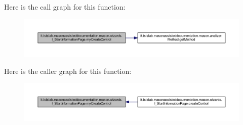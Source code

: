 Here is the call graph for this function\-:\nopagebreak
\begin{figure}[H]
\begin{center}
\leavevmode
\includegraphics[width=350pt]{classit_1_1isislab_1_1masonassisteddocumentation_1_1mason_1_1wizards_1_1_i___start_information_page_ae0a18d33050e71d0c590f8da3f4a3390_cgraph}
\end{center}
\end{figure}




Here is the caller graph for this function\-:\nopagebreak
\begin{figure}[H]
\begin{center}
\leavevmode
\includegraphics[width=350pt]{classit_1_1isislab_1_1masonassisteddocumentation_1_1mason_1_1wizards_1_1_i___start_information_page_ae0a18d33050e71d0c590f8da3f4a3390_icgraph}
\end{center}
\end{figure}




